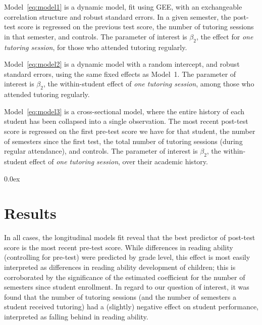 \documentclass[a0,landscape]{a0poster}
\begin{document}
\begin{multicols}{3}
Model~\ref{eq:model1} is a dynamic model, fit using GEE,
with an exchangeable correlation structure and
robust standard errors.
In a given semester, the post-test score is regressed
on the previous test score,
the number of tutoring sessions in that semester,
and controls.
The parameter of interest is $\beta_2$, the
effect for \textit{one tutoring session},
for those who attended tutoring regularly.

Model~\ref{eq:model2} is a dynamic model with a random intercept,
and robust standard errors, using the same
fixed effects as Model~1.
The parameter of interest is $\beta_2$, the
within-student effect of \textit{one tutoring session},
among those who attended tutoring regularly.

Model~\ref{eq:model3} is a cross-sectional model, where the
entire history of each student has been collapsed into a
single observation.
The most recent post-test score is regressed on
the first pre-test score we have for that student,
the number of semesters since the first test,
the total number of tutoring sessions (during regular attendance),
and controls.
The parameter of interest is $\beta_2$, the
within-student effect of \textit{one tutoring session},
over their academic history.




\color{NavyBlue}
\parskip 0.0ex
\section*{Results}
%
\color{Black}
\begin{center}\vspace{1cm}

\end{center}\vspace{0.5cm}
\color{NavyBlue}
%   
In all cases, the longitudinal models fit reveal that
the best predictor of post-test score is the most recent
pre-test score.
While differences in reading ability (controlling for pre-test)
were predicted by grade level, this effect is most easily
interpreted as differences in reading ability development
of children; this is corroborated by the significance of the
estimated coefficient for the number of semesters since
student enrollment.
In regard to our question of interest, it was found that the
number of tutoring sessions
(and the number of semesters a student received tutoring)
had a (slightly) negative effect on student performance, 
interpreted as falling behind in reading ability. 


\end{multicols}
\end{document}
